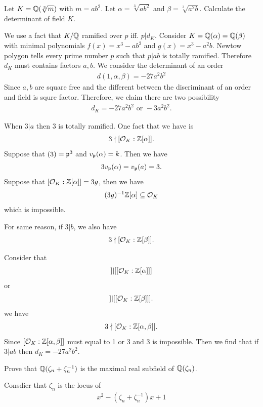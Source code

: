 {\prob Let $K=\mathbb{Q}(\sqrt[3]{m})$ with $m=ab^2$. Let $\alpha=\sqrt[3]{ab^2}$ and $\beta=\sqrt[3]{a^2b}$. Calculate the determinant of field $K$.

We use a fact that $K/\mathbb{Q}$ ramified over $p$ iff. $p|d_K$. Consider $K=\mathbb{Q}(\alpha)=\mathbb{Q}(\beta)$ with minimal polynomials $f(x)= x^3-ab^2$ and $g(x)=x^3-a^2b$.
Newtow polygon tells every prime number $p$ such that $p|ab$ is totally ramified.
Therefore $d_K$ must contains factors $a,b$. We consider the determinant of an order 
\begin{align*}
    d(1,\alpha,\beta) = -27a^2b^2
\end{align*}
Since $a,b$ are square free and the different between the discriminant of an order and field is squre factor. Therefore, we claim there are two possibility 
\begin{align*}
    d_K = -27a^2b^2\text{ or }-3a^2b^2.
\end{align*}

When $3|a$ then  3 is totally ramified. One fact that we have is 
\begin{align*}
    3\nmid [\mathcal{O}_K:\mathbb{Z}[\alpha]].
\end{align*}
Suppose that $(3) =\mathfrak{p}^3$ and $v_{\mathfrak{p}}(\alpha)=k$. Then we have 
\begin{align*}
    3v_{\mathfrak{p}}(\alpha) = v_{\mathfrak{p}}(a)=3.
\end{align*}
Suppose that $[\mathcal{O}_K:\mathbb{Z}[\alpha]]=3g$, then we have 
$$(3g)^{-1}\mathbb{Z}[\alpha]\subseteq \mathcal{O}_K$$  
which is impossible. 

For same reason, if $3|b$, we also have 
\begin{align*}
    3\nmid [\mathcal{O}_K:\mathbb{Z}[\beta]].
\end{align*}

Consider that 
\begin{align*}
    [\ok:\Z[\alpha,\beta]] | [[\ok:\Z[\alpha]]] 
\end{align*}
or 
\begin{align*}
    [\ok:\Z[\alpha,\beta]] | [[\ok:\Z[\beta]]].
\end{align*}
we have 
\begin{align*}
    3\nmid [\mathcal{O}_K:\mathbb{Z}[\alpha,\beta]]. 
\end{align*}
Since $[\mathcal{O}_K:\mathbb{Z}[\alpha,\beta]]$ must equal to 1 or 3 and 3 is impossible.
Then we find that if $3|ab$ then $d_K = -27a^2b^2$.

\prob Prove that $\mathbb{Q}(\zeta_n+\zeta_n^{-1})$ is the maximal real subfield of $\mathbb{Q}(\zeta_n)$.

Consdier that $\zeta_n$ is the locus of 
\begin{align*}
    x^2-(\zeta_n+\zeta_n^{-1})x+1 
\end{align*}

}

